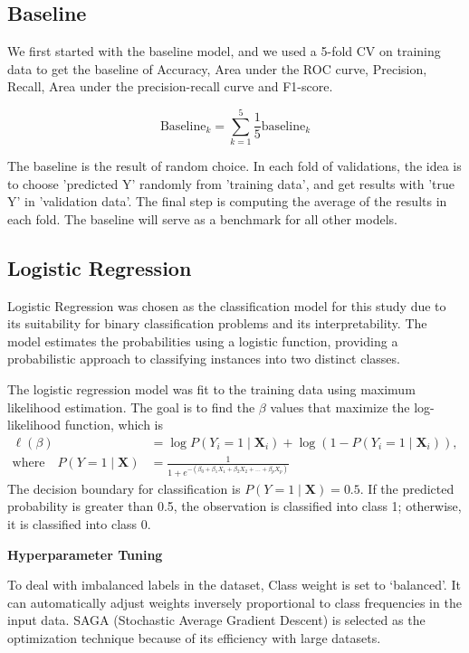 \documentclass[a4paper,11pt]{report}
\begin{document}
\subsection{Baseline}
We first started with the baseline model, and we used a 5-fold CV on training data to get the baseline of Accuracy, Area under the ROC curve, Precision, Recall, Area under the precision-recall curve and F1-score.

\begin{equation}
\mathrm{Baseline}_k=\sum_{k=1}^5 \frac{1}{5} \mathrm{baseline}_k
\end{equation}

The baseline is the result of random choice. In each fold of validations, the idea is to choose 'predicted Y' randomly from 'training data', and get results with 'true Y' in 'validation data'. The final step is computing the average of the results in each fold. The baseline will serve as a benchmark for all other models.

\subsection{Logistic Regression}
Logistic Regression was chosen as the classification model for this study due to its suitability for binary classification problems and its interpretability. The model estimates the probabilities using a logistic function, providing a probabilistic approach to classifying instances into two distinct classes.

The logistic regression model was fit to the training data using maximum likelihood estimation. The goal is to find the $\beta$ values that maximize the log-likelihood function, which is 
\begin{equation}
\begin{split}
\ell(\beta) & = \log P\left(Y_i=1 \mid \mathbf{X}_i\right) + \log \left(1-P\left(Y_i=1 \mid \mathbf{X}_i\right)\right), \\
\text{where} \quad P(Y=1 \mid \mathbf{X}) & =\frac{1}{1+e^{-\left(\beta_0+\beta_1 X_1+\beta_2 X_2+\ldots+\beta_p X_p\right)}}
\end{split}
\end{equation}
The decision boundary for classification is $P(Y=1 \mid \mathbf{X})=0.5$. If the predicted probability is greater than 0.5, the observation is classified into class 1; otherwise, it is classified into class 0.

\noindent\textbf{Hyperparameter Tuning}

To deal with imbalanced labels in the dataset, Class weight is set to ‘balanced’. It can automatically adjust weights inversely proportional to class frequencies in the input data. SAGA (Stochastic Average Gradient Descent) is selected as the optimization technique because of its efficiency with large datasets.
\end{document}

